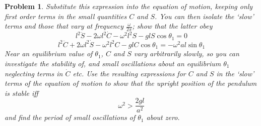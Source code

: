 \documentclass[a4paper]{article}
\theoremstyle{new}
\newtheorem{qns}{Problem}[section]
\begin{document}
\begin{qns}
Substitute this expression into the equation of motion, keeping only first order terms in the small quantities $C$ and $S$. You can then isolate the `slow' terms and those that vary at frequency $\frac{\omega}{2\pi}$; show that the latter obey
$$l^2\ddot{S}-2\omega l^2\dot{C}-\omega^2l^2S-glS\cos\theta_1=0$$
$$l^2\ddot{C}+2\omega l^2\dot{S}-\omega^2l^2C-glC\cos\theta_1=-\omega^2al\sin\theta_1$$
Near an equilibrium value of $\theta_1$, $C$ and $S$ vary arbitrarily slowly, so you can investigate the stability of, and small oscillations about an equilibrium $\theta_1$ neglecting terms in $\dot{C}$ etc. Use the resulting expressions for $C$ and $S$ in the `slow' terms of the equation of motion to show that the upright position of the pendulum is stable iff 
$$\omega^2>\frac{2gl}{a^2}$$
and find the period of small oscillations of $\theta_1$ about zero.
\end{qns}
\end{document}
